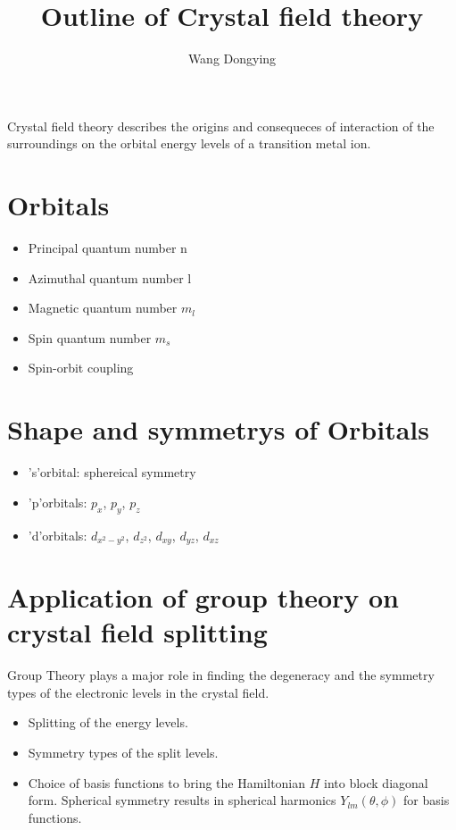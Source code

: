\documentclass{article}
\author{Wang Dongying}
\title{Outline of Crystal field theory}
\begin{document}
\maketitle

Crystal field theory describes the origins and consequeces of interaction of the surroundings on the orbital energy levels of a transition metal ion.

	\section{Orbitals}
		\begin{itemize}
			\item Principal quantum number n
			\item Azimuthal quantum number l
			\item Magnetic quantum number $m_{l}$
			\item Spin quantum number $m_{s}$
			\item Spin-orbit coupling
		\end{itemize}

	\section{Shape and symmetrys of Orbitals}
		\begin{itemize}
			\item 's'orbital: sphereical symmetry
			\item 'p'orbitals: $p_{x}$, $p_{y}$, $p_{z}$
			\item 'd'orbitals: $d_{x^{2} - y^{2}}$, $d_{z^{2}}$, $d_{xy}$, $d_{yz}$, $d_{xz}$
		\end{itemize}

	\section{Application of group theory on crystal field splitting}
		Group Theory plays a major role in finding the degeneracy and the symmetry types of the electronic levels in the crystal field.

		\begin{itemize}
			\item Splitting of the energy levels.
			\item Symmetry types of the split levels.
			\item Choice of basis functions to bring the Hamiltonian $H$ into block diagonal form. Spherical symmetry results in spherical harmonics $Y_{lm}(\theta, \phi)$ for basis functions.
		\end{itemize}
\end{document}
